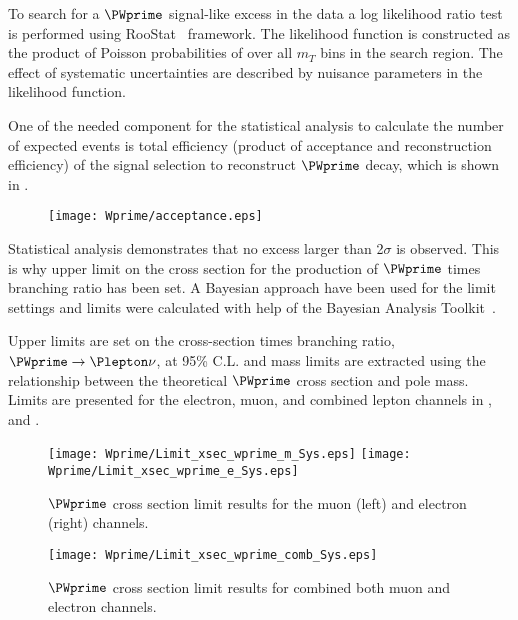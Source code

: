 To search for a $\PWprime$ signal-like excess in the data a log likelihood ratio test is performed using RooStat~\cite{RooStat_project} framework.
The likelihood function is constructed as the product of Poisson probabilities of over all $m_T$ bins in the search region.
The effect of systematic uncertainties are described by nuisance parameters in the likelihood function.

One of the needed component for the statistical analysis to calculate the number of expected events is total efficiency (product of acceptance and reconstruction efficiency) 
of the signal selection to reconstruct $\PWprime$ decay, which is shown in .

\begin{figure}[]
  \centering
  \texttt{[image: Wprime/acceptance.eps]}
  \caption{
  }
  \label{fig:AccEff_mu}
\end{figure}

Statistical analysis demonstrates that no excess larger than 2$\sigma$ is observed.
This is why upper limit on the cross section for the production of $\PWprime$ times branching ratio has been set. 
A Bayesian approach have been used for the limit settings and limits were calculated with help of the Bayesian Analysis Toolkit~\cite{BAT}.


Upper limits are set on the cross-section times branching ratio, $\PWprime \rightarrow \Plepton\nu$, at 95\% C.L. and mass 
limits are extracted using the relationship between the theoretical $\PWprime$ cross section and pole mass. Limits are presented for the electron, muon, 
and combined lepton channels in ,  and .

\begin{figure}[]
  \centering
\texttt{[image: Wprime/Limit\_xsec\_wprime\_m\_Sys.eps]}
\texttt{[image: Wprime/Limit\_xsec\_wprime\_e\_Sys.eps]}
\caption{$\PWprime$ cross section limit results for the muon (left) and electron (right) channels.}
\label{fig:wprime_limits}
\end{figure}


\begin{figure}[]
  \centering
\texttt{[image: Wprime/Limit\_xsec\_wprime\_comb\_Sys.eps]}
\caption{$\PWprime$ cross section limit results for combined both muon and electron channels.}
\label{fig:wprime_limits_combined}
\end{figure}


